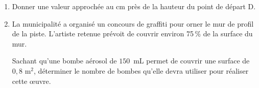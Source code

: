 \begin{enumerate}
	\begin{enumerate}
		\item  Donner une valeur approchée au cm près de la hauteur du point de départ D.
		\item  La municipalité a organisé un concours de graffiti pour orner le mur de profil de la piste. L'artiste retenue prévoit de couvrir environ 75\,\% de la surface du mur.

Sachant qu'une bombe aérosol de $150$~mL permet de couvrir une surface de $0,8$ m$^2$, déterminer le nombre de bombes qu'elle devra utiliser pour réaliser cette œuvre.
	\end{enumerate}
\end{enumerate}

\bigskip

